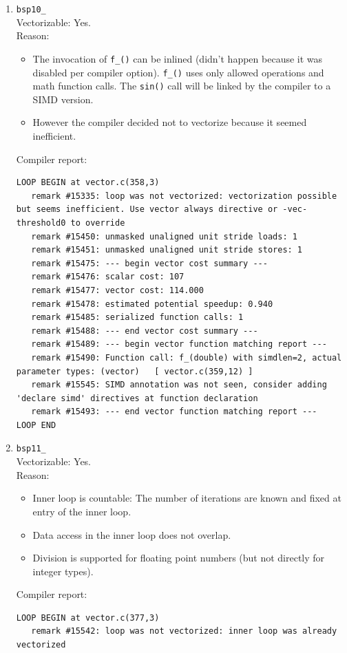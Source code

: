 \documentclass[11pt]{article}
\begin{document}
\begin{enumerate}
\item \texttt{bsp10\_}\\
Vectorizable: Yes.\\
Reason:
\begin{itemize}
\item The invocation of \texttt{f\_()} can be inlined (didn't happen because it was disabled per compiler option). \texttt{f\_()} uses only allowed operations and math function calls. The \texttt{sin()} call will be linked by the compiler to a SIMD version.
\item However the compiler decided not to vectorize because it seemed inefficient.
\end{itemize}
Compiler report:
\begin{lstlisting}
LOOP BEGIN at vector.c(358,3)
   remark #15335: loop was not vectorized: vectorization possible but seems inefficient. Use vector always directive or -vec-threshold0 to override 
   remark #15450: unmasked unaligned unit stride loads: 1 
   remark #15451: unmasked unaligned unit stride stores: 1 
   remark #15475: --- begin vector cost summary ---
   remark #15476: scalar cost: 107 
   remark #15477: vector cost: 114.000 
   remark #15478: estimated potential speedup: 0.940 
   remark #15485: serialized function calls: 1
   remark #15488: --- end vector cost summary ---
   remark #15489: --- begin vector function matching report ---
   remark #15490: Function call: f_(double) with simdlen=2, actual parameter types: (vector)   [ vector.c(359,12) ]
   remark #15545: SIMD annotation was not seen, consider adding 'declare simd' directives at function declaration 
   remark #15493: --- end vector function matching report ---
LOOP END
\end{lstlisting}

\item \texttt{bsp11\_}\\
Vectorizable: Yes.\\
Reason:
\begin{itemize}
\item Inner loop is countable: The number of iterations are known and fixed at entry of the inner loop.
\item Data access in the inner loop does not overlap.
\item Division is supported for floating point numbers (but not directly for integer types).
\end{itemize}
Compiler report:
\begin{lstlisting}
LOOP BEGIN at vector.c(377,3)
   remark #15542: loop was not vectorized: inner loop was already vectorized


\end{lstlisting}
\end{enumerate}
\end{document}
